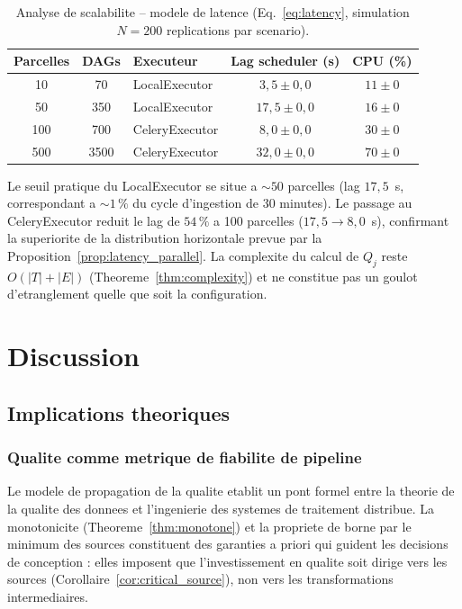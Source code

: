 \documentclass[12pt,a4paper]{article}
\theoremstyle{plain}
\theoremstyle{definition}
\theoremstyle{remark}
\begin{document}
	\begin{table}[H]
		\caption{Analyse de scalabilite -- modele de latence
			(Eq.~\ref{eq:latency}, simulation $N=200$ replications par scenario).}
		\label{tab:scalability}
		\centering\small
		\renewcommand{\arraystretch}{1.35}
		\begin{tabularx}{\linewidth}{ccXcc}
			\toprule
			\textbf{Parcelles} & \textbf{DAGs} & \textbf{Executeur} &
			\textbf{Lag scheduler (s)} & \textbf{CPU (\%)} \\
			\midrule
			\rowcolor{lightblue!30}
			10  & 70   & LocalExecutor  & $3{,}5 \pm 0{,}0$  & $11 \pm 0$ \\
			50  & 350  & LocalExecutor  & $17{,}5 \pm 0{,}0$ & $16 \pm 0$ \\
			\rowcolor{lightblue!30}
			100 & 700  & CeleryExecutor & $8{,}0 \pm 0{,}0$  & $30 \pm 0$ \\
			500 & 3500 & CeleryExecutor & $32{,}0 \pm 0{,}0$ & $70 \pm 0$ \\
			\bottomrule
		\end{tabularx}
	\end{table}
	
	Le seuil pratique du LocalExecutor se situe a $\sim 50$ parcelles
	(lag $17{,}5$~s, correspondant a $\sim 1\,\%$ du cycle d'ingestion
	de 30 minutes). Le passage au CeleryExecutor reduit le lag de $54\,\%$
	a 100 parcelles ($17{,}5 \to 8{,}0$~s), confirmant la superiorite de
	la distribution horizontale prevue par la
	Proposition~\ref{prop:latency_parallel}.
	La complexite du calcul de $Q_j$ reste $O(|T|+|E|)$
	(Theoreme~\ref{thm:complexity}) et ne constitue pas un goulot
	d'etranglement quelle que soit la configuration.
	
	\section{Discussion}
	\label{sec:discussion}
	
	\subsection{Implications theoriques}
	
	\subsubsection{Qualite comme metrique de fiabilite de pipeline}
	
	Le modele de propagation de la qualite etablit un pont formel entre
	la theorie de la qualite des donnees \cite{data_lineage_quality} et
	l'ingenierie des systemes de traitement distribue. La monotonicite
	(Theoreme~\ref{thm:monotone}) et la propriete de borne par le minimum
	des sources constituent des garanties a priori qui guident les decisions
	de conception : elles imposent que l'investissement en qualite soit
	dirige vers les sources (Corollaire~\ref{cor:critical_source}),
	non vers les transformations intermediaires.
	
\end{document}
